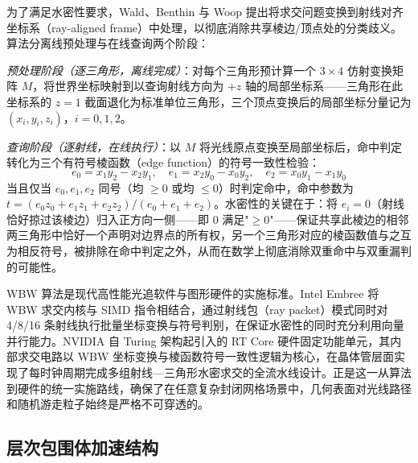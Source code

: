 为了满足水密性要求，Wald、Benthin 与 Woop 提出将求交问题变换到射线对齐坐标系（ray-aligned frame）中处理，以彻底消除共享棱边/顶点处的分类歧义\cite{woopWatertightRayTriangle2013}。算法分离线预处理与在线查询两个阶段：

\textit{预处理阶段（逐三角形，离线完成）}：对每个三角形预计算一个 $3\times 4$ 仿射变换矩阵 $M$，将世界坐标映射到以查询射线方向为 $+z$ 轴的局部坐标系——三角形在此坐标系的 $z=1$ 截面退化为标准单位三角形，三个顶点变换后的局部坐标分量记为 $(x_i, y_i, z_i)$，$i=0,1,2$。

\textit{查询阶段（逐射线，在线执行）}：以 $M$ 将光线原点变换至局部坐标后，命中判定转化为三个有符号棱函数（edge function）的符号一致性检验：
\begin{equation}
    e_0 = x_1 y_2 - x_2 y_1,\quad
    e_1 = x_2 y_0 - x_0 y_2,\quad
    e_2 = x_0 y_1 - x_1 y_0
    \label{eq:WBW_edge}
\end{equation}
当且仅当 $e_0, e_1, e_2$ 同号（均 $\geq 0$ 或均 $\leq 0$）时判定命中，命中参数为 $t = (e_0 z_0 + e_1 z_1 + e_2 z_2)/(e_0 + e_1 + e_2)$。水密性的关键在于：将 $e_i = 0$（射线恰好掠过该棱边）归入正方向一侧——即 $0$ 满足"$\geq 0$"——保证共享此棱边的相邻两三角形中恰好一个声明对边界点的所有权，另一个三角形对应的棱函数值与之互为相反符号，被排除在命中判定之外，从而在数学上彻底消除双重命中与双重漏判的可能性。

WBW 算法是现代高性能光追软件与图形硬件的实施标准。Intel Embree 将 WBW 求交内核与 SIMD 指令相结合，通过射线包（ray packet）模式同时对 4/8/16 条射线执行批量坐标变换与符号判别，在保证水密性的同时充分利用向量并行能力。NVIDIA 自 Turing 架构起引入的 RT Core 硬件固定功能单元，其内部求交电路以 WBW 坐标变换与棱函数符号一致性逻辑为核心，在晶体管层面实现了每时钟周期完成多组射线—三角形水密求交的全流水线设计。正是这一从算法到硬件的统一实施路线，确保了在任意复杂封闭网格场景中，几何表面对光线路径和随机游走粒子始终是严格不可穿透的。

\subsection{层次包围体加速结构}

